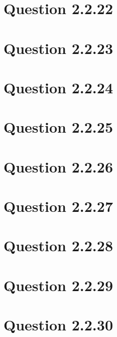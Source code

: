 \documentclass[journal,12pt,twocolumn]{IEEEtran}
\begin{document}
\section{\textbf{Question 2.2.22}}

\section{\textbf{Question 2.2.23}}

\section{\textbf{Question 2.2.24}}

\section{\textbf{Question 2.2.25}}

\section{\textbf{Question 2.2.26}}

\section{\textbf{Question 2.2.27}}

\section{\textbf{Question 2.2.28}}

\section{\textbf{Question 2.2.29}}

\section{\textbf{Question 2.2.30}}

\end{document}
